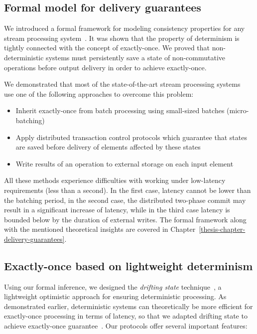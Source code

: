 \subsection{Formal model for delivery guarantees}

We introduced a formal framework for modeling consistency properties for any stream processing system~\cite{thepaper}. It was shown that the property of determinism is tightly connected with the concept of exactly-once. We proved that non-deterministic systems must persistently save a state of non-commutative operations before output delivery in order to achieve exactly-once.

We demonstrated that most of the state-of-the-art stream processing systems~\cite{Carbone:2017:SMA:3137765.3137777, Zaharia:2012:DSE:2342763.2342773, Akidau:2013:MFS:2536222.2536229, apache:storm:trident} use one of the following approaches to overcome this problem: 

\begin{itemize}
    \item Inherit exactly-once from batch processing using small-sized batches (micro-batching)
    \item Apply distributed transaction control protocols which guarantee that states are saved before delivery of elements affected by these states
    \item Write results of an operation to external storage on each input element
\end{itemize}

All these methods experience difficulties with working under low-latency requirements (less than a second). In the first case, latency cannot be lower than the batching period, in the second case, the distributed two-phase commit may result in a significant increase of latency, while in the third case latency is bounded below by the duration of external writes. The formal framework along with the mentioned theoretical insights are covered in Chapter~\ref{thesis-chapter-delivery-guarantees}.

\subsection{Exactly-once based on lightweight determinism}

Using our formal inference, we designed the \textit{drifting state} technique~\cite{we2018adbis}, a lightweight optimistic approach for ensuring deterministic processing. As demonstrated earlier, deterministic systems can theoretically be more efficient for exactly-once processing in terms of latency, so that we adapted drifting state to achieve exactly-once guarantee~\cite{thepaper}. Our protocols offer several important features:

